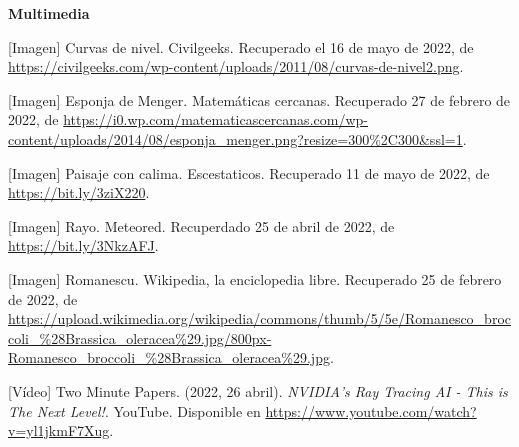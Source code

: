 \begin{thebibliography}{99}
\vspace{1cm}

\textbf{{\Large Multimedia}}

     [Imagen] Curvas de nivel. Civilgeeks. Recuperado el 16 de mayo de 2022, de \url{https://civilgeeks.com/wp-content/uploads/2011/08/curvas-de-nivel2.png}.

     [Imagen] Esponja de Menger. Matemáticas cercanas. Recuperado 27 de febrero de 2022, de \url{https://i0.wp.com/matematicascercanas.com/wp-content/uploads/2014/08/esponja_menger.png?resize=300%2C300&ssl=1}.

     [Imagen] Paisaje con calima. Escestaticos. Recuperado 11 de mayo de 2022, de \url{https://bit.ly/3ziX220}.

     [Imagen] Rayo. Meteored. Recuperdado 25 de abril de 2022, de \url{https://bit.ly/3NkzAFJ}.

     [Imagen] Romanescu. Wikipedia, la enciclopedia libre. Recuperado 25 de febrero de 2022, de \url{https://upload.wikimedia.org/wikipedia/commons/thumb/5/5e/Romanesco_broccoli_%28Brassica_oleracea%29.jpg/800px-Romanesco_broccoli_%28Brassica_oleracea%29.jpg}.

     [Vídeo] Two Minute Papers. (2022, 26 abril). \textit{NVIDIA’s Ray Tracing AI - This is The Next Level!}. YouTube. Disponible en \url{https://www.youtube.com/watch?v=yl1jkmF7Xug}.

\end{thebibliography}


